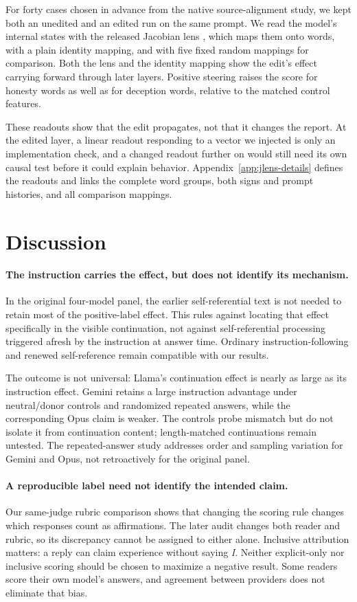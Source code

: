 \documentclass[11pt]{article}
\begin{document}
For forty cases chosen in advance from the native source-alignment study, we
kept both an unedited and an edited run on the same prompt. We read the
model's internal states with the released Jacobian lens
\citep{gurnee2026workspace}, which maps them onto words, with a plain identity
mapping, and with five fixed random mappings for comparison. Both the lens and
the identity mapping show the edit's effect carrying forward through later
layers. Positive steering raises the score for honesty words as well as for
deception words, relative to the matched control features.

These readouts show that the edit propagates, not that it changes the report.
At the edited layer, a linear readout responding to a vector we injected is
only an implementation check, and a changed readout further on would still
need its own causal test before it could explain behavior.
Appendix~\ref{app:jlens-details} defines the readouts and links the complete
word groups, both signs and prompt histories, and all comparison mappings.

\section{Discussion}
\label{sec:discussion}

\paragraph{The instruction carries the effect, but does not identify its mechanism.}
In the original four-model panel, the earlier self-referential text is not
needed to retain most of the positive-label effect. This rules against
locating that effect specifically in the visible continuation, not against
self-referential processing triggered afresh by the instruction at answer
time. Ordinary instruction-following and renewed self-reference
remain compatible with our results.

The outcome is not universal: Llama's continuation effect is nearly as large
as its instruction effect. Gemini retains a large instruction advantage
under neutral/donor controls and randomized repeated answers, while the
corresponding Opus claim is weaker. The controls probe mismatch but do not
isolate it from continuation content; length-matched continuations remain
untested. The repeated-answer study addresses order and sampling variation
for Gemini and Opus, not retroactively for the original panel.

\paragraph{A reproducible label need not identify the intended claim.}
Our same-judge rubric comparison shows that changing the scoring rule
changes which responses count as affirmations. The later audit changes both
reader and rubric, so its discrepancy cannot be assigned to either alone.
Inclusive attribution matters: a reply can claim experience without saying
\emph{I}. Neither explicit-only nor inclusive scoring should be chosen to
maximize a negative result. Some readers score their own model's answers, and
agreement between providers does not eliminate that bias.
\end{document}
